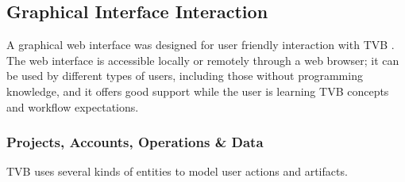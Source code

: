\subsection{Graphical Interface Interaction}

		A graphical web interface was designed for user friendly
		interaction with TVB . The web interface is accessible locally or
		remotely through a web browser; it can be used by different types of
		users, including those without programming knowledge, and it offers
		good support while the user is learning TVB concepts and workflow
		expectations.  

		\subsubsection{Projects, Accounts, Operations \& Data}

		TVB uses several kinds of entities to model user actions
        and artifacts.

